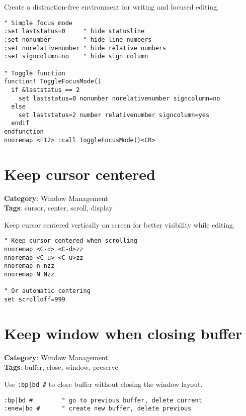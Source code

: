 {{{{{{{{{{{{{{{{{{Create a distraction-free environment for writing and focused editing.

\begin{Exa*}{}
\begin{Verbatim}[fontsize=\footnotesize, breaklines, breakanywhere]
" Simple focus mode
:set laststatus=0     " hide statusline
:set nonumber         " hide line numbers
:set norelativenumber " hide relative numbers
:set signcolumn=no    " hide sign column

" Toggle function
function! ToggleFocusMode()
  if &laststatus == 2
    set laststatus=0 nonumber norelativenumber signcolumn=no
  else
    set laststatus=2 number relativenumber signcolumn=yes
  endif
endfunction
nnoremap <F12> :call ToggleFocusMode()<CR>
\end{Verbatim}
\end{Exa*}

\section{Keep cursor centered}

\textbf{Category}: Window Management\\ \textbf{Tags}: cursor, center, scroll, display
\vspace{0.5cm}

Keep cursor centered vertically on screen for better visibility while editing.

\begin{Exa*}{}
\begin{Verbatim}[fontsize=\footnotesize, breaklines, breakanywhere]
" Keep cursor centered when scrolling
nnoremap <C-d> <C-d>zz
nnoremap <C-u> <C-u>zz
nnoremap n nzz
nnoremap N Nzz

" Or automatic centering
set scrolloff=999
\end{Verbatim}
\end{Exa*}

\section{Keep window when closing buffer}

\textbf{Category}: Window Management\\ \textbf{Tags}: buffer, close, window, preserve
\vspace{0.5cm}

Use {\footnotesize \Verb§:bp|bd #§} to close buffer without closing the window layout.

\begin{Exa*}{}
\begin{Verbatim}[fontsize=\footnotesize, breaklines, breakanywhere]
:bp|bd #        " go to previous buffer, delete current
:enew|bd #      " create new buffer, delete previous
\end{Verbatim}
\end{Exa*}

}}}}}}}}}}}}}}}}}}
